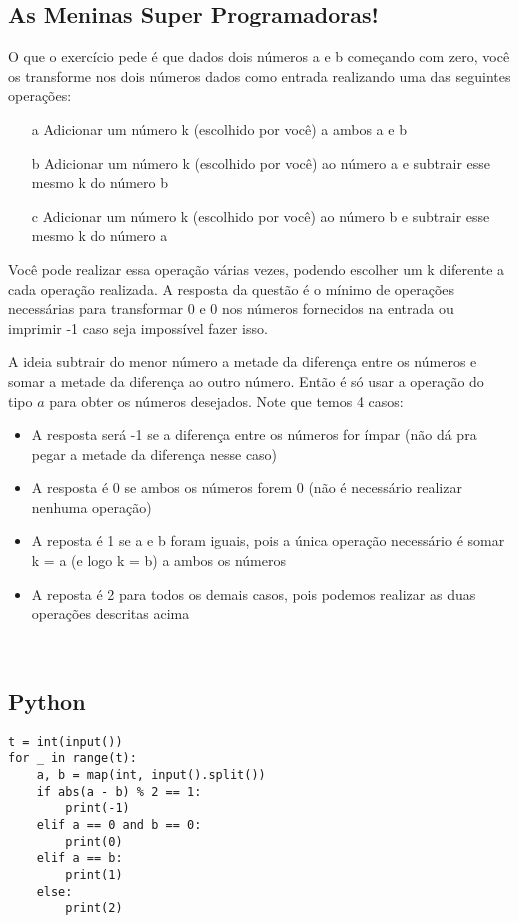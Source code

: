 \documentclass[11pt,fancychapters]{article}
\begin{document}
\begin{center}\section{As Meninas Super Programadoras!}\end{center}
\noindent
O que o exercício pede é que dados dois números a e b começando com zero, você os transforme nos dois números dados como entrada realizando uma das seguintes operações:
\begin{itemize}
    \item[a] Adicionar um número k (escolhido por você) a ambos a e b
    \item[b] Adicionar um número k (escolhido por você) ao número a e subtrair esse mesmo k do número b
    \item[c] Adicionar um número k (escolhido por você) ao número b e subtrair esse mesmo k do número a
\end{itemize}
Você pode realizar essa operação várias vezes, podendo escolher um k diferente a cada operação realizada. A resposta da questão é o mínimo de operações necessárias para transformar 0 e 0 nos números fornecidos na entrada ou imprimir -1 caso seja impossível fazer isso.

A ideia subtrair do menor número a metade da diferença entre os números e somar a metade da diferença ao outro número. Então é só usar a operação do tipo $a$ para obter os números desejados. Note que temos 4 casos:
\begin{itemize}
    \item A resposta será -1 se a diferença entre os números for ímpar (não dá pra pegar a metade da diferença nesse caso)
    \item A resposta é 0 se ambos os números forem 0 (não é necessário realizar nenhuma operação)
    \item A reposta é 1 se a e b foram iguais, pois a única operação necessário é somar k = a (e logo k = b) a ambos os números
    \item A reposta é 2 para todos os demais casos, pois podemos realizar as duas operações descritas acima
\end{itemize}
\\
\subsection{Python}
\begin{lstlisting}[style=python]
t = int(input())
for _ in range(t):
    a, b = map(int, input().split())
    if abs(a - b) % 2 == 1:
        print(-1)
    elif a == 0 and b == 0:
        print(0)
    elif a == b:
        print(1)
    else:
        print(2)
\end{lstlisting}
\newpage
\end{document}
